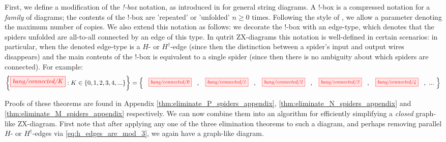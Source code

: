 First, we define a modification of the \emph{!-box} notation,
as introduced in \cite{dixon2009graphical} for general string diagrams. A !-box is a compressed notation for a \emph{family} of diagrams; the contents of the !-box
are 'repeated' or 'unfolded' $n\geq 0$ times.
Following the style of \cite{backens2018zh}, we allow a parameter denoting the maximum number of copies.
We also extend this notation as follows: we decorate the !-box with an edge-type, which denotes that the spiders unfolded are all-to-all connected by an edge of this type. In qutrit ZX-diagrams this notation is well-defined in certain scenarios: in particular, when the denoted edge-type is a $H$- or $H^{\dagger}$-edge (since then the distinction between a spider's input and output wires disappears) and the main contents of the !-box is equivalent to a single spider (since then there is no ambiguity about which spiders are connected). For example:
\begin{equation*}
	\left\{ \tikzfig{bang/connected/K} : K \in \{0, 1, 2, 3, 4, ... \} \right\} =
	\left\{ ~
		\scalebox{0.8}{\tikzfig{bang/connected/0}} \ , \
		\scalebox{0.8}{\tikzfig{bang/connected/1}} \ , \
		\scalebox{0.8}{\tikzfig{bang/connected/2}} \ , \
		\scalebox{0.8}{\tikzfig{bang/connected/3}} \ , \
		\scalebox{0.8}{\tikzfig{bang/connected/4}} \ , \ ...
	~ \right\}
\end{equation*}
\begin{theorem}\label{thm:eliminate_P_spiders}
	\eliminatePSpidersStatement
\end{theorem}
\begin{theorem}\label{thm:eliminate_N_spiders}
	\eliminateNSpidersStatement
\end{theorem}
\begin{theorem}\label{thm:eliminate_M_spiders}
	\eliminateMSpidersStatement
\end{theorem}

Proofs of these theorems are found in Appendix \ref{thm:eliminate_P_spiders_appendix}, \ref{thm:eliminate_N_spiders_appendix} and \ref{thm:eliminate_M_spiders_appendix} respectively. We can now combine them into an algorithm for efficiently simplifying a \emph{closed} graph-like ZX-diagram. First note that after applying any one of the three elimination theorems to such a diagram, and perhaps removing parallel $H$- or $H^\dagger$-edges via \eqref{eq:h_edges_are_mod_3}, we again have a graph-like diagram.

